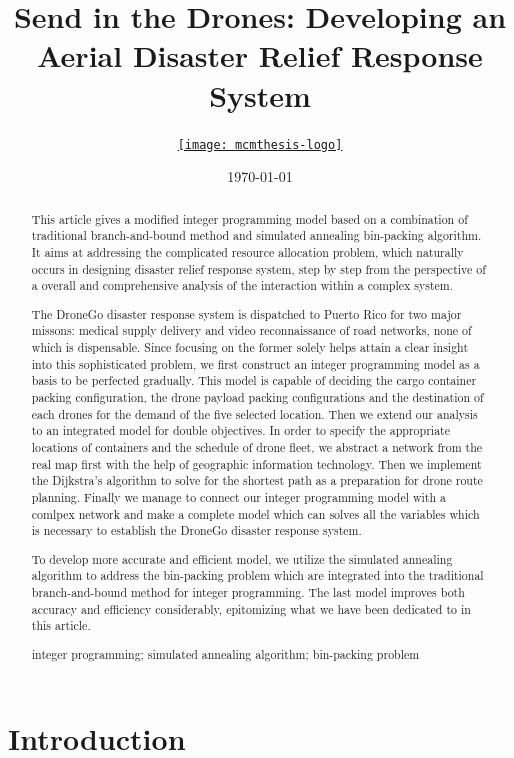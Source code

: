 \documentclass{mcmthesis}
\title{Send in the Drones: Developing an Aerial Disaster Relief Response System}
\author{\small \href{http://www.latexstudio.net/}
  {\texttt{[image: mcmthesis-logo]}}}
\date{\today}
\begin{document}
\begin{abstract}
This article gives a modified integer programming model based on a combination of traditional branch-and-bound method and simulated annealing bin-packing algorithm. It aims at addressing the complicated resource allocation problem, which naturally occurs in designing disaster relief response system, step by step from the perspective of a overall and comprehensive analysis of the interaction within a complex system. 

The DroneGo disaster response system is dispatched to Puerto Rico for two major missons: medical supply delivery and video reconnaissance of road networks, none of which is dispensable. Since focusing on the former solely helps attain a clear insight into this sophisticated problem, we first construct an integer programming model as a basis to be perfected gradually. This model is capable of deciding the cargo container packing configuration, the drone payload packing configurations and the destination of each drones for the demand of the five selected location. Then we extend our analysis to an integrated model for double objectives. In order to specify the appropriate locations of containers and the schedule of drone fleet, we abstract a network from the real map first with the help of geographic information technology. Then we implement the Dijkstra's algorithm to solve for the shortest path as a preparation for drone route planning. Finally we manage to connect our integer programming model with a comlpex network and make a complete model which can solves all the variables which is necessary to establish the DroneGo disaster response system. 

To develop more accurate and efficient model, we utilize the simulated annealing algorithm to address the bin-packing problem which are integrated into the traditional branch-and-bound method for integer programming. The last model improves both accuracy and efficiency considerably, epitomizing what we have been dedicated to in this article.
\begin{keywords}
integer programming; simulated annealing algorithm; bin-packing problem
\end{keywords}
\end{abstract}
\maketitle
\tableofcontents
\newpage

\section{Introduction}
\end{document}
